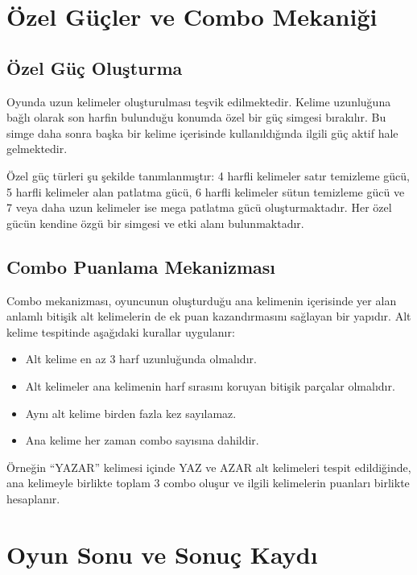 \documentclass[conference]{IEEEtran}
\begin{document}
\section{Özel Güçler ve Combo Mekaniği}

\subsection{Özel Güç Oluşturma}

Oyunda uzun kelimeler oluşturulması teşvik edilmektedir. Kelime uzunluğuna bağlı olarak son harfin bulunduğu konumda özel bir güç simgesi bırakılır. Bu simge daha sonra başka bir kelime içerisinde kullanıldığında ilgili güç aktif hale gelmektedir.

Özel güç türleri şu şekilde tanımlanmıştır: 4 harfli kelimeler satır temizleme gücü, 5 harfli kelimeler alan patlatma gücü, 6 harfli kelimeler sütun temizleme gücü ve 7 veya daha uzun kelimeler ise mega patlatma gücü oluşturmaktadır. Her özel gücün kendine özgü bir simgesi ve etki alanı bulunmaktadır.

\subsection{Combo Puanlama Mekanizması}

Combo mekanizması, oyuncunun oluşturduğu ana kelimenin içerisinde yer alan anlamlı bitişik alt kelimelerin de ek puan kazandırmasını sağlayan bir yapıdır. Alt kelime tespitinde aşağıdaki kurallar uygulanır:

\begin{itemize}
  \item Alt kelime en az 3 harf uzunluğunda olmalıdır.
  \item Alt kelimeler ana kelimenin harf sırasını koruyan bitişik parçalar olmalıdır.
  \item Aynı alt kelime birden fazla kez sayılamaz.
  \item Ana kelime her zaman combo sayısına dahildir.
\end{itemize}

Örneğin ``YAZAR'' kelimesi içinde YAZ ve AZAR alt kelimeleri tespit edildiğinde, ana kelimeyle birlikte toplam 3 combo oluşur ve ilgili kelimelerin puanları birlikte hesaplanır.

\section{Oyun Sonu ve Sonuç Kaydı}
\end{document}

